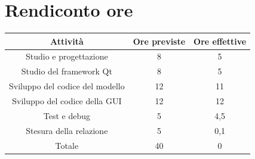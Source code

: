 \documentclass[10pt]{article}
\begin{document}
\section{Rendiconto ore}

\begin{center}
    \begin{tabular}{| c | c | c |} \hline
    Attività & Ore previste & Ore effettive \\\hline
    Studio e progettazione & 8 & 5 \\
    Studio del framework Qt & 8 & 5 \\
    Sviluppo del codice del modello & 12 & 11 \\
    Sviluppo del codice della GUI & 12 & 12 \\
    Test e debug & 5 & 4,5 \\
    Stesura della relazione & 5 & 0,1 \\\hline
    Totale & 40 & 0 \\\hline
    \end{tabular}
\end{center}
\end{document}
